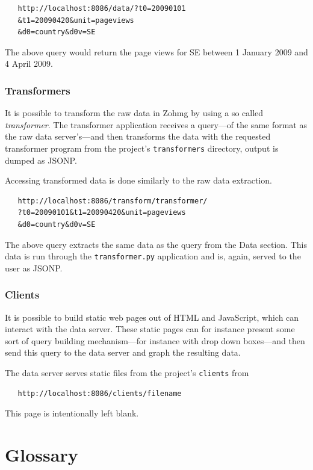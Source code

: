 \begin{verbatim}
   http://localhost:8086/data/?t0=20090101
   &t1=20090420&unit=pageviews
   &d0=country&d0v=SE
\end{verbatim}

The above query would return the page views for SE between 1 January
2009 and 4 April 2009.


\subsection*{Transformers}

It is possible to transform the raw data in Zohmg by using a so called
\textit{transformer}. The transformer application receives a query---of the same
format as the raw data server's---and then transforms the data with the
requested transformer program from the project's \texttt{transformers}
directory, output is dumped as JSONP.

Accessing transformed data is done similarly to the raw data extraction.

\begin{verbatim}
   http://localhost:8086/transform/transformer/
   ?t0=20090101&t1=20090420&unit=pageviews
   &d0=country&d0v=SE
\end{verbatim}

The above query extracts the same data as the query from the Data
section. This data is run through the \texttt{transformer.py} application and
is, again, served to the user as JSONP.


\subsection*{Clients}

It is possible to build static web pages out of HTML and JavaScript, which
can interact with the data server. These static pages can for instance
present some sort of query building mechanism---for instance with drop down
boxes---and then send this query to the data server and graph the resulting
data.

The data server serves static files from the project's \texttt{clients} from

\begin{verbatim}
   http://localhost:8086/clients/filename
\end{verbatim}


\pagebreak
This page is intentionally left blank.
\pagebreak


\chapter{Glossary}


